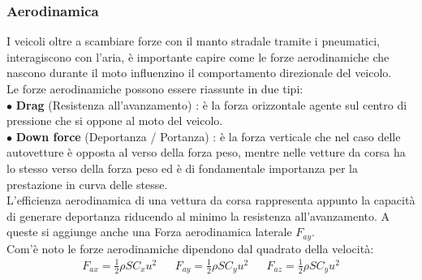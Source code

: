 \subsubsection{Aerodinamica}
I veicoli oltre a scambiare forze con il manto stradale tramite i pneumatici, interagiscono con l'aria, è importante capire come le forze aerodinamiche che nascono durante il moto influenzino il comportamento direzionale del veicolo.\\
Le forze aerodinamiche possono essere riassunte in due tipi:\\
$\bullet$ \textbf{Drag} (Resistenza all'avanzamento) : è la forza orizzontale agente sul centro di pressione che si oppone al moto del veicolo.\\
$\bullet$ \textbf{Down force} (Deportanza / Portanza) : è la forza verticale che nel caso delle autovetture è opposta al verso della forza peso, mentre nelle vetture da corsa ha lo stesso verso della forza peso ed è di fondamentale importanza per la prestazione in curva delle stesse.\\
L'efficienza aerodinamica di una vettura da corsa rappresenta appunto la capacità di generare deportanza riducendo al minimo la resistenza all'avanzamento.
A queste si aggiunge anche una Forza aerodinamica laterale $F_{ay}$.\\
Com'è noto le forze aerodinamiche dipendono dal quadrato della velocità:\\
\begin{align*}
F_{ax} = \frac{1}{2}\rho S C_x u^2 &&  F_{ay} = \frac{1}{2}\rho S C_y u^2 &&  F_{az} = \frac{1}{2}\rho S C_y u^2\\
\end{align*}